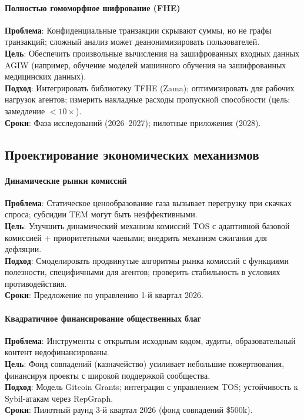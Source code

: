 \documentclass[11pt]{article}
\begin{document}
\paragraph{Полностью гомоморфное шифрование (FHE)}
\textbf{Проблема}: Конфиденциальные транзакции скрывают суммы, но не графы транзакций; сложный анализ может деанонимизировать пользователей.\\
\textbf{Цель}: Обеспечить произвольные вычисления на зашифрованных входных данных AGIW (например, обучение моделей машинного обучения на зашифрованных медицинских данных).\\
\textbf{Подход}: Интегрировать библиотеку TFHE (Zama); оптимизировать для рабочих нагрузок агентов; измерить накладные расходы пропускной способности (цель: замедление $<10\times$).\\
\textbf{Сроки}: Фаза исследований (2026--2027); пилотные приложения (2028).

\subsection{Проектирование экономических механизмов}

\paragraph{Динамические рынки комиссий}
\textbf{Проблема}: Статическое ценообразование газа вызывает перегрузку при скачках спроса; субсидии TEM могут быть неэффективными.\\
\textbf{Цель}: Улучшить динамический механизм комиссий TOS с адаптивной базовой комиссией + приоритетными чаевыми; внедрить механизм сжигания для дефляции.\\
\textbf{Подход}: Смоделировать продвинутые алгоритмы рынка комиссий с функциями полезности, специфичными для агентов; проверить стабильность в условиях противодействия.\\
\textbf{Сроки}: Предложение по управлению 1-й квартал 2026.

\paragraph{Квадратичное финансирование общественных благ}
\textbf{Проблема}: Инструменты с открытым исходным кодом, аудиты, образовательный контент недофинансированы.\\
\textbf{Цель}: Фонд совпадений (казначейство) усиливает небольшие пожертвования, финансируя проекты с широкой поддержкой сообщества.\\
\textbf{Подход}: Модель Gitcoin Grants; интеграция с управлением TOS; устойчивость к Sybil-атакам через RepGraph.\\
\textbf{Сроки}: Пилотный раунд 3-й квартал 2026 (фонд совпадений \$500k).
\end{document}
